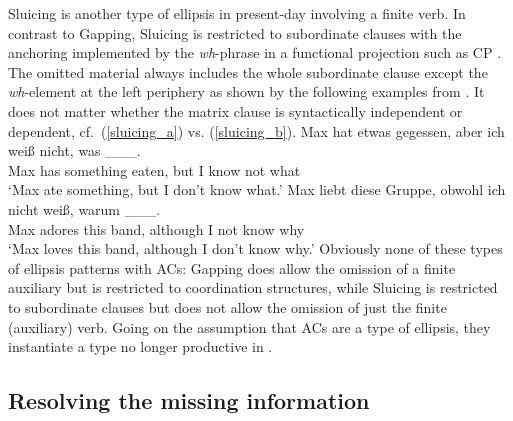 \documentclass[output=paper,colorlinks,citecolor=brown]{langscibook}
\begin{document}
Sluicing is another type of ellipsis in present-day  involving a finite verb. In contrast to Gapping, Sluicing is restricted to subordinate clauses with the anchoring implemented by the \textit{wh}-phrase in a functional projection such as CP \citep{repp2009}. The omitted material always includes the whole subordinate clause except the \textit{wh}-element at the left periphery as shown by the following examples from \textcite{repp2009}. It does not matter whether the matrix clause is syntactically independent or dependent, cf.\ (\ref{sluicing_a}) vs. (\ref{sluicing_b}).
\eal
\ex \label{sluicing_a}
\gll Max hat etwas gegessen, aber ich weiß nicht, was \_\_\_. \\ Max has something eaten, but I know not what  \\
\glt `Max ate something, but I don't know what.'
\ex \label{sluicing_b}
\gll Max liebt diese Gruppe, obwohl ich nicht weiß, warum \_\_\_.\\ Max adores this band, although I not know why  \\
\glt `Max loves this band, although I don't know why.'
\zl
Obviously none of these types of ellipsis patterns with ACs: Gapping does allow the omission of a finite auxiliary but is restricted to coordination structures, while Sluicing is restricted to subordinate clauses but does not allow the omission of just the finite (auxiliary) verb. Going on the assumption that ACs are a type of ellipsis, they instantiate a type no longer productive in .

\subsection{Resolving the missing information}
\end{document}
